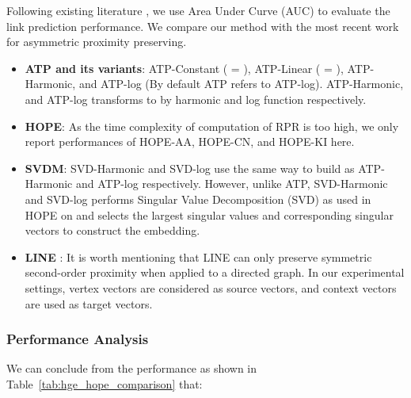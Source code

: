 \documentclass[letterpaper]{article} \usepackage{aaai19}  \usepackage{times}  \usepackage{helvet}  \usepackage{courier}  \usepackage{url}  \usepackage{graphicx}  \usepackage{booktabs} \usepackage{xcolor}
\begin{document}
Following existing literature \cite{grovernode2vec,ijcai2017-fastNetworkEmbedding,Tran2018}, we use Area Under Curve (AUC) to evaluate the link prediction performance. We compare our method with the most recent work for asymmetric proximity preserving.

\begin{itemize}[leftmargin=0.4cm,noitemsep]
    \item \textbf{ATP and its variants}: ATP-Constant ( = ), ATP-Linear ( = ), ATP-Harmonic, and ATP-log (By default ATP refers to ATP-log). ATP-Harmonic, and ATP-log transforms  to  by harmonic and log function respectively.  
    \item \textbf{HOPE}\cite{Ou2016KDDAsymmetric}: 
As the time complexity of computation of RPR is too high, we only report performances of HOPE-AA, HOPE-CN, and HOPE-KI here. \item \textbf{SVDM}: SVD-Harmonic and SVD-log use the same way to build  as ATP-Harmonic and ATP-log respectively. However, unlike ATP, SVD-Harmonic and SVD-log performs Singular Value Decomposition (SVD) as used in HOPE on  and selects the largest  singular values and corresponding singular vectors to construct the embedding. 
\item \textbf{LINE} \cite{Tang2015Line}: It is worth mentioning that LINE can only preserve symmetric second-order proximity when applied to a directed graph. In our experimental settings, vertex vectors are considered as source vectors, and context vectors are used as target vectors.  
\end{itemize}


\subsubsection{Performance Analysis} 

We can conclude from the performance as shown in Table~\ref{tab:hge_hope_comparison} that: 
\end{document}
